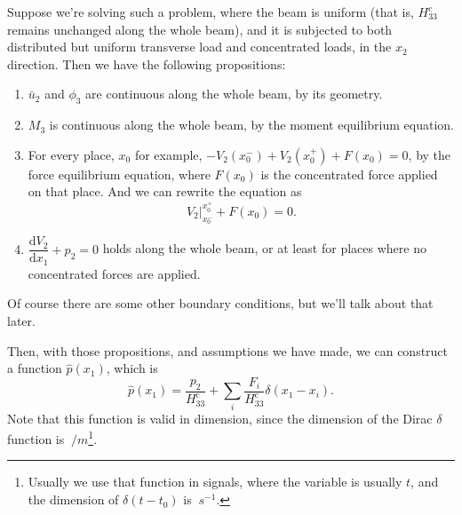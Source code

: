 \documentclass{article}
\begin{document}
Suppose we're solving such a problem, where the beam is uniform (that is, $H_{33}^{\text{c}}$ remains unchanged along the whole beam), and it is subjected to both distributed but uniform transverse load and concentrated loads, in the $x_2$ direction. Then we have the following propositions:
\begin{enumerate}
  \item $\bar{u}_2$ and $\phi_3$ are continuous along the whole beam, by its geometry.
  \item $M_3$ is continuous along the whole beam, by the moment equilibrium equation.
  \item For every place, $x_0$ for example, $-V_2(x_0^-) + V_2(x_0^+) + F(x_0) = 0$, by the force equilibrium equation, where $F(x_0)$ is the concentrated force applied on that place. And we can rewrite the equation as
  \begin{equation}
  V_2 \vert_{x_0^-}^{x_0^+} + F(x_0) = 0.
  \label{eq:V_2}
  \end{equation}
  \item $\dfrac{\mathrm{d} V_2}{\mathrm{d} x_1} + p_2 = 0$ holds along the whole beam, or at least for places where no concentrated forces are applied.
\end{enumerate}
Of course there are some other boundary conditions, but we'll talk about that later.

Then, with those propositions, and assumptions we have made, we can construct a function $\hat{p}(x_1)$, which is
\begin{equation}
\hat{p}(x_1) = \dfrac{p_2}{H_{33}^{\text{c}}} + \sum_i \dfrac{F_i}{H_{33}^{\text{c}}} \delta(x_1 - x_i).
\label{eq:phat}
\end{equation}
Note that this function is valid in dimension, since the dimension of the Dirac $\delta$ function is $\SI{}{/m}$\footnote{Usually we use that function in signals, where the variable is usually $t$, and the dimension of $\delta(t - t_0)$ is $\SI{}{s^{-1}}$.}.
\end{document}
